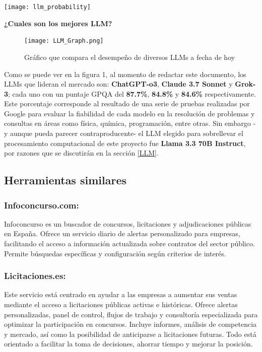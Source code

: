 \documentclass{article}
\begin{document}
\begin{center}
\texttt{[image: llm\_probability]}
\end{center}

\setlength{\parindent}{10pt} %
\textbf{¿Cuales son los mejores LLM?}  \\


\begin{figure}[H] %
\centering
\texttt{[image: LLM\_Graph.png]}
\caption{Gráfico que compara el desempeño de diversos LLMs a fecha de hoy} 
\cite{llm-stats}
\label{tab:LLM_Graph}
\end{figure}

Como se puede ver en la figura 1, al momento de redactar este documento, los LLMs que lideran el mercado son: \textbf{ChatGPT-o3}, \textbf{Claude 3.7 Sonnet} y \textbf{Grok-3}; cada uno con un puntaje GPQA del \textbf{87.7\%}, \textbf{84.8\%} y \textbf{84.6\%} respectivamente. Este porcentaje corresponde al resultado de una serie de pruebas realizadas por Google para evaluar la fiabilidad de cada modelo en la resolución de problemas y consultas en áreas como física, química, programación, entre otras.
Sin embargo -y aunque pueda parecer contraproducente- el LLM elegido para sobrellevar el procesamiento computacional de este proyecto fue \textbf{Llama 3.3 70B Instruct}, por razones que se discutirán en la sección \ref{LLM}.


\subsection{Herramientas similares} 
  \subsubsection{Infoconcurso.com:} Infoconcurso es un buscador de concursos, licitaciones y adjudicaciones públicas en España. Ofrece un servicio diario de alertas personalizado para empresas, facilitando el acceso a información actualizada sobre contratos del sector público. Permite búsquedas específicas y configuración según criterios de interés.
  \cite{infoconcurso}
  
  \subsubsection{Licitaciones.es:} Este servicio está centrado en ayudar a las empresas a aumentar sus ventas mediante el acceso a licitaciones públicas activas e históricas. Ofrece alertas personalizadas, panel de control, flujos de trabajo y consultoría especializada para optimizar la participación en concursos. Incluye informes, análisis de competencia y mercado, así como la posibilidad de anticiparse a licitaciones futuras. Todo está orientado a facilitar la toma de decisiones, ahorrar tiempo y mejorar la posición. 
  \cite{licitaciones}
  
\end{document}
